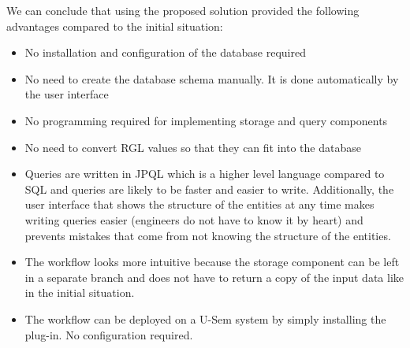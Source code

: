 We can conclude that using the proposed solution provided the following advantages compared to the initial situation:

\begin{itemize}
	\item No installation and configuration of the database required
	\item No need to create the database schema manually. It is done automatically by the user interface
	\item No programming required for implementing storage and query components
	\item No need to convert RGL values so that they can fit into the database
	\item Queries are written in JPQL which is a higher level language compared to SQL and queries are likely to be faster and easier to write. Additionally, the user interface that shows the structure of the entities at any time makes writing queries easier (engineers do not have to know it by heart) and prevents mistakes that come from not knowing the structure of the entities. 
	\item The workflow looks more intuitive because the storage component can be left in a separate branch and does not have to return a copy of the input data like in the initial situation.
	\item The workflow can be deployed on a U-Sem system by simply installing the plug-in. No configuration required.
\end{itemize}
